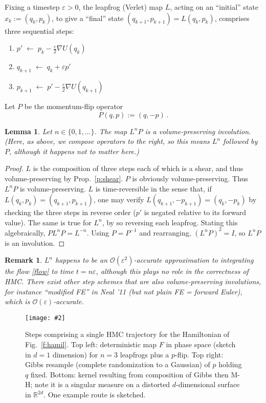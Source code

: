 \documentclass[10pt]{article}
\newcommand{\ben}{\begin{enumerate}}
\newcommand{\een}{\end{enumerate}}
\newcommand{\bfi}{\begin{figure}}
\newcommand{\efi}{\end{figure}}
\newcommand{\ca}[2]{\caption{#1 \label{#2}}}
\newcommand{\ig}[2]{\texttt{[image: \#2]}}
\newcommand{\R}{\mathbb{R}}
\newcommand{\bigO}{{\mathcal O}}
\newtheorem{lem}[thm]{Lemma}
\newtheorem{rmk}[thm]{Remark}
\newcommand{\eps}{\varepsilon}
\begin{document}
Fixing a timestep $\eps>0$, the leapfrog (Verlet) map $L$,
acting on an ``initial'' state $x_k:=(q_k,p_k)$,
to give a ``final'' state $(q_{k+1},p_{k+1}) = L(q_k,p_k)$,
comprises three sequential steps:
\ben
\item $p'     \;\leftarrow\; p_k - \frac{\eps}{2} \nabla U(q_k)$
\item $q_{k+1} \;\leftarrow\; q_k + \eps p'$
\item $p_{k+1} \;\leftarrow\; p' - \frac{\eps}{2} \nabla U(q_{k+1})$
\een
Let $P$ be the momentum-flip operator
$$
P(q,p) := (q,-p)~.
$$
\begin{lem}
  Let $n\in\{0,1,\dots\}$.
  The map $L^n P$ is a volume-preserving involution.
  (Here, as above, we compose operators to the right, so this
  means $L^n$ followed by $P$, although it happens not to
  matter here.)
  \label{l:LnP}
\end{lem}
\begin{proof}
  $L$ is the composition of three steps each of which is a shear, and thus
  volume-preserving by Prop.~\ref{p:shear}. $P$ is obviously volume-preserving.
  Thus $L^nP$ is volume-preserving.
  $L$ is time-reversible in the sense that, if $L(q_k,p_k)=(q_{k+1},p_{k+1})$,
  one may verify $L(q_{k+1},-p_{k+1})=(q_k,-p_k)$ by
  checking the three steps in reverse order ($p'$ is negated relative
  to its forward value).
  The same is true for $L^n$, by so reversing each leapfrog.
  Stating this algebraically, $PL^n P = L^{-n}$. Using $P=P^{-1}$ and
  rearranging, $(L^nP)^2 = I$, so $L^n P$ is an involution.
\end{proof}

\begin{rmk}
  $L^n$ happens to be
  an $\bigO(\eps^2)$-accurate approximation to integrating the
  flow \eqref{flow} to time $t = n\eps$,
  although this plays no role in the correctness of HMC.
  There exist other step schemes that are also volume-preserving involutions,
  for instance ``modified FE'' in Neal '11 (but not plain FE = forward Euler),
  which is $\bigO(\eps)$-accurate.
\end{rmk}


\bfi  %
\centering\ig{width=4in}{HMC.eps}
\ca{Steps comprising a single HMC trajectory for the Hamiltonian of Fig.~\ref{f:hamil}.
  Top left: deterministic map $F$ in phase space (sketch in $d=1$ dimension) for $n=3$ leapfrogs plus a $p$-flip.
  Top right: Gibbs resample (complete randomization to a Gaussian)
  of $p$ holding $q$ fixed.
  Bottom: kernel resulting from composition of Gibbs then M-H; note it is
  a singular measure on a distorted $d$-dimensional surface in $\R^{2d}$.
  One example route is sketched.}{f:HMC}
\efi
\end{document}
